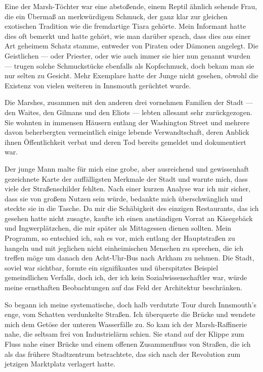 Eine der Marsh-Töchter war eine  abstoßende, einem Reptil ähnlich sehende Frau, die ein Übermaß an merkwürdigem Schmuck, der ganz klar zur gleichen exotischen Tradition wie die fremdartige Tiara gehörte. Mein Informant hatte dies oft bemerkt und hatte gehört, wie man darüber sprach, dass dies aus einer Art geheimem Schatz stamme, entweder von Piraten oder Dämonen angelegt. Die Geistlichen --- oder Priester, oder wie auch immer sie hier nun genannt wurden --- trugen solche Schmuckstücke ebenfalls als Kopfschmuck, doch bekam man sie nur selten zu Gesicht. Mehr Exemplare hatte der Junge nicht gesehen, obwohl die Existenz von vielen weiteren in Innsmouth gerüchtet wurde.

Die Marshes, zusammen mit den anderen drei vornehmen Familien der Stadt --- den Waites, den Gilmans und den Eliots --- lebten allesamt sehr zurückgezogen. Sie wohnten in immensen Häusern entlang der Washington Street und mehrere davon beherbergten vermeintlich einige lebende Verwandtschaft, deren Anblick ihnen Öffentlichkeit verbat und deren Tod bereits gemeldet und dokumentiert war.

Der junge Mann malte für mich eine grobe, aber ausreichend und gewissenhaft gezeichnete Karte der auffälligsten Merkmale der Stadt und warnte mich, dass viele der Straßenschilder fehlten. Nach einer kurzen Analyse war ich mir sicher, dass sie von großem Nutzen sein würde, bedankte mich überschwänglich und steckte sie in die Tasche. Da mir die Schäbigkeit des einzigen Restaurants, das ich gesehen hatte nicht zusagte, kaufte ich einen anständigen Vorrat an Käsegebäck und Ingwerplätzchen, die mir später als Mittagessen dienen sollten. Mein Programm, so entschied ich, sah es vor, mich entlang der Hauptstraßen zu hangeln und mit jeglichen nicht einheimischen Menschen zu sprechen, die ich treffen möge um danach den Acht-Uhr-Bus nach Arkham zu nehmen. Die Stadt, soviel war sichtbar, formte ein signifikantes und überspitztes Beispiel gemeindlichen Verfalls, doch ich, der ich kein Sozialwissenschaftler war, würde meine ernsthaften Beobachtungen auf das Feld der Architektur beschränken.

So begann ich meine systematische, doch halb verdutzte Tour durch Innsmouth's enge, vom Schatten verdunkelte Straßen. Ich überquerte die Brücke und wendete mich dem Getöse der unteren Wasserfälle zu. So kam ich der Marsh-Raffinerie nahe, die seltsam frei von Industrielärm schien. Sie stand auf der Klippe zum Fluss nahe einer Brücke und einem offenen Zusammenfluss von Straßen, die ich als das frühere Stadtzentrum betrachtete, das sich nach der Revolution zum jetzigen Marktplatz verlagert hatte.


